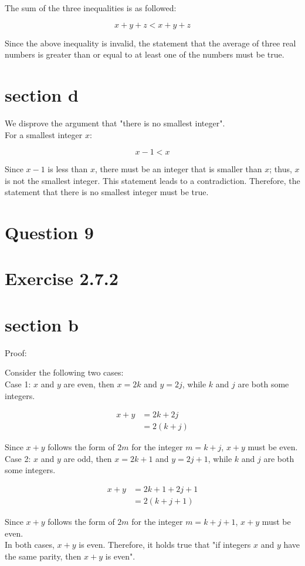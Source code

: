 \documentclass[10pt]{article}
\begin{document}
The sum of the three inequalities is as followed:

$$
x+y+z<x+y+z
$$

Since the above inequality is invalid, the statement that the average of three real numbers is greater than or equal to at least one of the numbers must be true.

\section*{section d}
We disprove the argument that "there is no smallest integer".\\
For a smallest integer $x$:

$$
x-1<x
$$

Since $x-1$ is less than $x$, there must be an integer that is smaller than $x$; thus, $x$ is not the smallest integer. This statement leads to a contradiction. Therefore, the statement that there is no smallest integer must be true.

\pagebreak
\section*{Question 9}
\section*{Exercise 2.7.2}
\section*{section b}
Proof:

Consider the following two cases:\\
Case 1: $x$ and $y$ are even, then $x=2 k$ and $y=2 j$, while $k$ and $j$ are both some integers.

$$
\begin{aligned}
x+y & =2 k+2 j \\
& =2(k+j)
\end{aligned}
$$

Since $x+y$ follows the form of $2 m$ for the integer $m=k+j$, $x+y$ must be even.\\
Case 2: $x$ and $y$ are odd, then $x=2 k+1$ and $y=2 j+1$, while $k$ and $j$ are both some integers.

$$
\begin{aligned}
x+y & =2 k+1+2 j+1 \\
& =2(k+j+1)
\end{aligned}
$$

Since $x+y$ follows the form of $2 m$ for the integer $m=k+j+1$, $x+y$ must be even.\\
In both cases, $x+y$ is even. Therefore, it holds true that "if integers $x$ and $y$ have the same parity, then $x+y$ is even".
\end{document}
